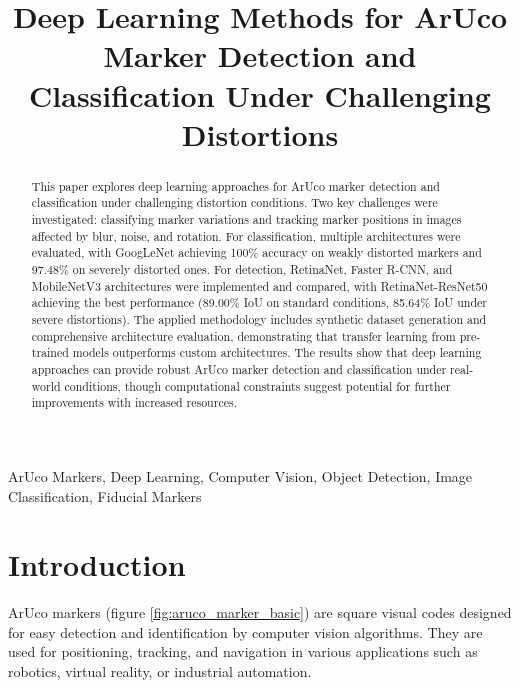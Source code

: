 \documentclass[conference]{IEEEtran}
\begin{document}
\title{Deep Learning Methods for ArUco Marker Detection and Classification Under Challenging Distortions}

\author{
}

\maketitle
\begin{abstract}

This paper explores deep learning approaches for ArUco marker detection and classification under challenging distortion conditions.
Two key challenges were investigated: classifying marker variations and tracking marker positions in images affected by blur, noise, and rotation.
For classification, multiple architectures were evaluated, with GoogLeNet achieving 100\% accuracy on weakly distorted markers and 97.48\% on severely distorted ones.
For detection, RetinaNet, Faster R-CNN, and MobileNetV3 architectures were implemented and compared, with RetinaNet-ResNet50 achieving the best performance
(89.00\% IoU on standard conditions, 85.64\% IoU under severe distortions).
The applied methodology includes synthetic dataset generation and comprehensive architecture evaluation,
demonstrating that transfer learning from pre-trained models outperforms custom architectures.
The results show that deep learning approaches can provide robust ArUco marker detection and classification under real-world
conditions, though computational constraints suggest potential for further improvements with increased resources.

\end{abstract}

\begin{IEEEkeywords}
ArUco Markers, Deep Learning, Computer Vision, Object Detection, Image Classification, Fiducial Markers
\end{IEEEkeywords}

\section{Introduction}

ArUco markers (figure \ref{fig:aruco_marker_basic}) are square visual codes designed for easy detection and identification by computer vision algorithms. 
They are used for positioning, tracking, and navigation in various applications such as robotics, virtual reality, or industrial automation.
\end{document}
